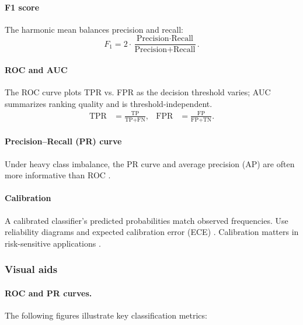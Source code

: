 \paragraph{F1 score} The harmonic mean balances precision and recall:
\begin{equation}
F_1 = 2 \cdot \frac{\text{Precision} \cdot \text{Recall}}{\text{Precision} + \text{Recall}}.
\end{equation}

\paragraph{ROC and AUC} The ROC curve  plots TPR vs. FPR as the decision threshold varies; AUC summarizes ranking quality and is threshold-independent.
\begin{align}
\text{TPR} &= \frac{\text{TP}}{\text{TP} + \text{FN}}, & \text{FPR} &= \frac{\text{FP}}{\text{FP} + \text{TN}}.
\end{align}

\paragraph{Precision--Recall (PR) curve} Under heavy class imbalance, the PR curve  and average precision (AP) are often more informative than ROC \textcite{Prince2023}.

\paragraph{Calibration} A calibrated classifier's predicted probabilities match observed frequencies. Use reliability diagrams and expected calibration error (ECE) . Calibration matters in risk-sensitive applications \textcite{GoodfellowEtAl2016}.

\subsubsection*{Visual aids}

\paragraph{ROC and PR curves.} The following figures illustrate key classification metrics:

